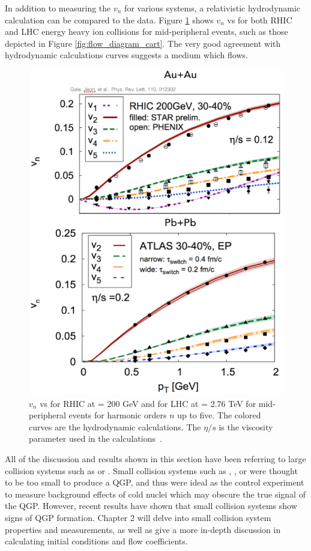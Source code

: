 In addition to measuring the $v_n$ for various systems, a relativistic hydrodynamic calculation can be compared to the data. Figure \ref{fig:vn_aa_hydro} shows $v_n$ vs \pt for both RHIC and LHC energy heavy ion collisions for mid-peripheral events, such as those depicted in Figure \ref{fig:flow_diagram_cart}. The very good agreement with hydrodynamic calculations  curves suggests a medium which flows.

\begin{figure}[!ht]
\centering
\includegraphics[width=0.65\linewidth]{figs/vn_aa_pbpb_hydro.PNG}
\caption{$v_n$ vs \pt for RHIC \auau at \sqsn = 200 GeV and for LHC \pbpb at \sqsn = 2.76 TeV for mid-peripheral events for harmonic orders $n$ up to five. The colored curves are the hydrodynamic calculations. The $\eta/s$ is the viscosity parameter used in the calculations~\cite{PhysRevLett.110.012302}.}
\label{fig:vn_aa_hydro}
\end{figure}

All of the discussion and results shown in this section have been referring to large collision systems such as \auau or \pbpb. Small collision systems such as \pa, \dau, or \pp were thought to be too small to produce a QGP, and thus were ideal as the control experiment to measure background effects of cold nuclei which may obscure the true signal of the QGP. However, recent results have shown that small collision systems show signs of QGP formation. Chapter 2 will delve into small collision system properties and measurements, as well as give a more in-depth discussion in calculating initial conditions and flow coefficients.

